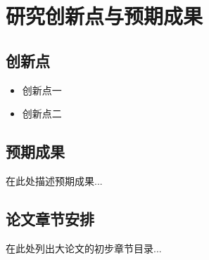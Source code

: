 \section{研究创新点与预期成果}

\subsection{创新点}
\begin{itemize}
    \item 创新点一
    \item 创新点二
\end{itemize}

\subsection{预期成果}
在此处描述预期成果...

\subsection{论文章节安排}
在此处列出大论文的初步章节目录...
